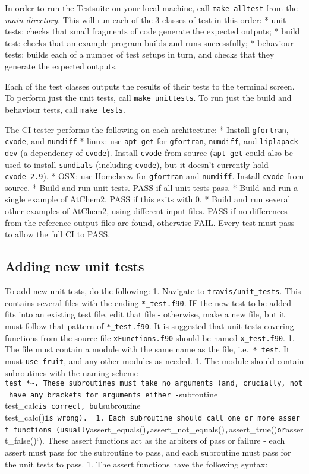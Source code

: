 In order to run the Testsuite on your local machine, call
\texttt{make\ alltest} from the \emph{main directory}. This will run
each of the 3 classes of test in this order: * unit tests: checks that
small fragments of code generate the expected outputs; * build test:
checks that an example program builds and runs successfully; * behaviour
tests: builds each of a number of test setups in turn, and checks that
they generate the expected outputs.

Each of the test classes outputs the results of their tests to the
terminal screen. To perform just the unit tests, call
\texttt{make\ unittests}. To run just the build and behaviour tests,
call \texttt{make\ tests}.

The CI tester performs the following on each architecture: * Install
\texttt{gfortran}, \texttt{cvode}, and \texttt{numdiff} * linux: use
\texttt{apt-get} for \texttt{gfortran}, \texttt{numdiff}, and
\texttt{liplapack-dev} (a dependency of \texttt{cvode}). Install
\texttt{cvode} from source (\texttt{apt-get} could also be used to
install \texttt{sundials} (including \texttt{cvode}), but it doesn't
currently hold \texttt{cvode\ 2.9}). * OSX: use Homebrew for
\texttt{gfortran} and \texttt{numdiff}. Install \texttt{cvode} from
source. * Build and run unit tests. PASS if all unit tests pass. * Build
and run a single example of AtChem2. PASS if this exits with 0. * Build
and run several other examples of AtChem2, using different input files.
PASS if no differences from the reference output files are found,
otherwise FAIL. Every test must pass to allow the full CI to PASS.

\subsection{Adding new unit tests} \label{subsec:adding-new-unit-tests}

To add new unit tests, do the following: 1. Navigate to
\texttt{travis/unit\_tests}. This contains several files with the ending
\texttt{*\_test.f90}. IF the new test to be added fits into an existing
test file, edit that file - otherwise, make a new file, but it must
follow that pattern of \texttt{*\_test.f90}. It is suggested that unit
tests covering functions from the source file \texttt{xFunctions.f90}
should be named \texttt{x\_test.f90}. 1. The file must contain a module
with the same name as the file, i.e.~\texttt{*\_test}. It must
\texttt{use\ fruit}, and any other modules as needed. 1. The module
should contain subroutines with the naming scheme
\texttt{test\_*\textasciitilde{}.\ These\ subroutines\ must\ take\ no\ arguments\ (and,\ crucially,\ not\ have\ any\ brackets\ for\ arguments\ either\ -}subroutine
test\_calc\texttt{is\ correct,\ but}subroutine
test\_calc()\texttt{is\ wrong).\ \ 1.\ Each\ subroutine\ should\ call\ one\ or\ more\ assert\ functions\ (usually}assert\_equals()\texttt{,}assert\_not\_equals()\texttt{,}assert\_true()\texttt{or}assert\_false()`).
These assert functions act as the arbiters of pass or failure - each
assert must pass for the subroutine to pass, and each subroutine must
pass for the unit tests to pass. 1. The assert functions have the
following syntax:

